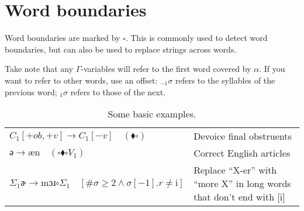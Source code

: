 \documentclass{book}
\begin{document}
\section{Word boundaries}

Word boundaries are marked by $\square$. This is commonly used to detect word boundaries, but can also be used to replace strings across words.

Take note that any $\Gamma$-variables will refer to the first word covered by $\alpha$. If you want to refer to other words, use an offset: $_{-1}\sigma$ refers to the syllables of the previous word; $_1\sigma$ refers to those of the next.

\begin{table}[h]
  \caption{Some basic examples.}
  \centering
  \begin{tabu} to \linewidth {|l|X|}
    \hline
    $C_1[+ob,+v] \rightarrow C_1[-v] \quad(\blacklozenge \square)$ & Devoice final obstruents \\
    $\text{ə} \rightarrow \text{æn} \quad(\square \blacklozenge \square V_1)$ & Correct English articles \\
    $\Sigma_1 \text{ɚ} \rightarrow \text{mɔɹ} \square \Sigma_1 \quad[\#\sigma \ge 2 \land \sigma[-1].r \ne \text{i}]$ & Replace ``X-er'' with ``more X'' in long words that don't end with [i] \\
    \hline
  \end{tabu}
\end{table}
\end{document}
